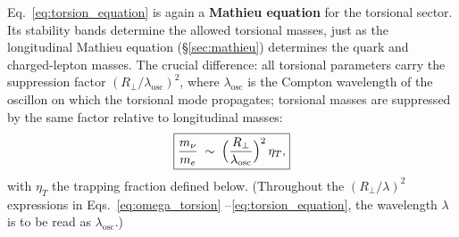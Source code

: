 \documentclass[11pt]{article}
\begin{document}
Eq.~\eqref{eq:torsion_equation} is again a
\textbf{Mathieu equation} for the torsional
sector.  Its stability bands determine the allowed
torsional masses, just as the longitudinal Mathieu
equation (\S\ref{sec:mathieu}) determines the
quark and charged-lepton masses.  The crucial
difference: all torsional parameters carry the
suppression factor
$(R_\perp/\lambda_{\mathrm{osc}})^2$, where
$\lambda_{\mathrm{osc}}$ is the Compton
wavelength of the oscillon on which the
torsional mode propagates; torsional masses
are suppressed by the same factor relative to
longitudinal masses:
\begin{equation}\label{eq:neutrino_mass_scale}
  \boxed{
  \frac{m_\nu}{m_e}
  \;\sim\;
  \Bigl(\frac{R_\perp}{\lambda_{\mathrm{osc}}}\Bigr)^2
  \,\eta_T ,
  }
\end{equation}
with $\eta_T$ the trapping fraction defined
below.  (Throughout the $(R_\perp/\lambda)^2$
expressions in Eqs.~\eqref{eq:omega_torsion}%
--\eqref{eq:torsion_equation}, the wavelength
$\lambda$ is to be read as
$\lambda_{\mathrm{osc}}$.)
\end{document}
